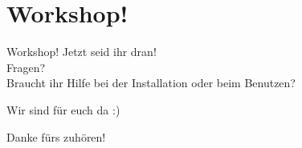 \documentclass{beamer}
\begin{document}
\section{Workshop!}
\begin{frame} {Workshop!}
	Jetzt seid ihr dran!\\
	Fragen?\\
	Braucht ihr Hilfe bei der Installation oder beim Benutzen?\\
	\hspace{1cm}
	
	Wir sind für euch da :)
	\\
	\hspace{1cm}
	
	Danke fürs zuhören!
\end{frame}
\end{document}
